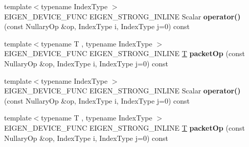 \begin{DoxyCompactItemize}
\item 
\mbox{\label{struct_eigen_1_1internal_1_1nullary__wrapper_3_01_scalar_00_01_nullary_op_00_01false_00_01false_00_01true_01_4_a868b895dc899e5dec1bb2a1ff5f976d1}} 
{\footnotesize template$<$typename Index\+Type $>$ }\\E\+I\+G\+E\+N\+\_\+\+D\+E\+V\+I\+C\+E\+\_\+\+F\+U\+NC E\+I\+G\+E\+N\+\_\+\+S\+T\+R\+O\+N\+G\+\_\+\+I\+N\+L\+I\+NE Scalar {\bfseries operator()} (const Nullary\+Op \&op, Index\+Type i, Index\+Type j=0) const
\item 
\mbox{\label{struct_eigen_1_1internal_1_1nullary__wrapper_3_01_scalar_00_01_nullary_op_00_01false_00_01false_00_01true_01_4_ad7c433c198afd74853b4b55c07dda35c}} 
{\footnotesize template$<$typename T , typename Index\+Type $>$ }\\E\+I\+G\+E\+N\+\_\+\+D\+E\+V\+I\+C\+E\+\_\+\+F\+U\+NC E\+I\+G\+E\+N\+\_\+\+S\+T\+R\+O\+N\+G\+\_\+\+I\+N\+L\+I\+NE \hyperlink{group___sparse_core___module}{T} {\bfseries packet\+Op} (const Nullary\+Op \&op, Index\+Type i, Index\+Type j=0) const
\item 
\mbox{\label{struct_eigen_1_1internal_1_1nullary__wrapper_3_01_scalar_00_01_nullary_op_00_01false_00_01false_00_01true_01_4_a868b895dc899e5dec1bb2a1ff5f976d1}} 
{\footnotesize template$<$typename Index\+Type $>$ }\\E\+I\+G\+E\+N\+\_\+\+D\+E\+V\+I\+C\+E\+\_\+\+F\+U\+NC E\+I\+G\+E\+N\+\_\+\+S\+T\+R\+O\+N\+G\+\_\+\+I\+N\+L\+I\+NE Scalar {\bfseries operator()} (const Nullary\+Op \&op, Index\+Type i, Index\+Type j=0) const
\item 
\mbox{\label{struct_eigen_1_1internal_1_1nullary__wrapper_3_01_scalar_00_01_nullary_op_00_01false_00_01false_00_01true_01_4_ad7c433c198afd74853b4b55c07dda35c}} 
{\footnotesize template$<$typename T , typename Index\+Type $>$ }\\E\+I\+G\+E\+N\+\_\+\+D\+E\+V\+I\+C\+E\+\_\+\+F\+U\+NC E\+I\+G\+E\+N\+\_\+\+S\+T\+R\+O\+N\+G\+\_\+\+I\+N\+L\+I\+NE \hyperlink{group___sparse_core___module}{T} {\bfseries packet\+Op} (const Nullary\+Op \&op, Index\+Type i, Index\+Type j=0) const
\end{DoxyCompactItemize}


